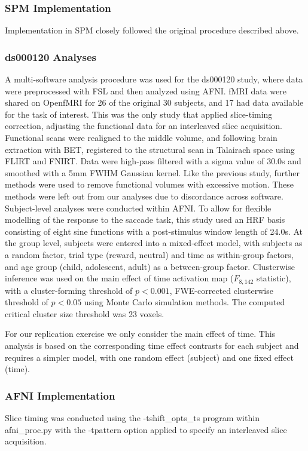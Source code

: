 \subsubsection{SPM Implementation}
Implementation in SPM closely followed the original procedure described above.


\subsubsection{ds000120 Analyses}

A multi-software analysis procedure was used for the ds000120 study, where data were preprocessed with FSL and then analyzed using AFNI. fMRI data were shared on OpenfMRI for 26 of the original 30 subjects, and 17 had data available for the task of interest. This was the only study that applied slice-timing correction, adjusting the functional data for an interleaved slice acquisition. Functional scans were realigned to the middle volume, and following brain extraction with BET, registered to the structural scan in Talairach space using FLIRT and FNIRT. Data were high-pass filtered with a sigma value of 30.0s and smoothed with a 5mm FWHM Gaussian kernel. Like the previous study, further methods were used to remove functional volumes with excessive motion. These methods were left out from our analyses due to discordance across software. Subject-level analyses were conducted within AFNI. To allow for flexible modelling of the response to the saccade task, this study used an HRF basis consisting of eight sine functions with a post-stimulus window length of 24.0s. At the group level, subjects were entered into a mixed-effect model, with subjects as a random factor, trial type (reward, neutral) and time as within-group factors, and age group (child, adolescent, adult) as a between-group factor. Clusterwise inference was used on the main effect of time activation map ($F_{8,142}$ statistic), with a cluster-forming threshold of $p < 0.001$, FWE-corrected clusterwise threshold of $p < 0.05$ using  Monte Carlo simulation methods. The computed critical cluster size threshold was 23 voxels. 

For our replication exercise we only consider the main effect of time.  This analysis is based on the corresponding time effect contrasts for each subject and requires a simpler model, with one random effect (subject) and one fixed effect (time). 


\subsubsection{AFNI Implementation}
Slice timing was conducted using the -tshift\_opts\_ts program within afni\_proc.py with the -tpattern option applied to specify an interleaved slice acquisition. 

